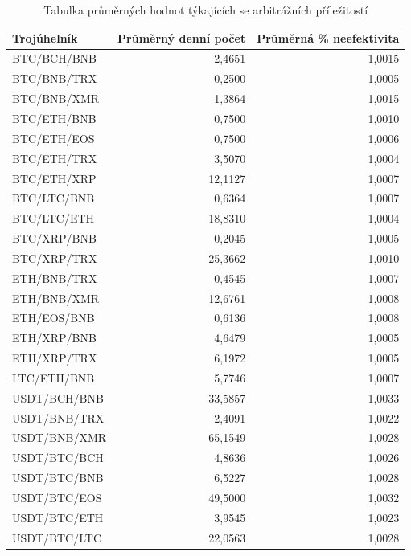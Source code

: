 \documentclass[thesis=B,czech]{FITthesis}[2019/03/21]
\begin{document}

\begin{table}\centering
\caption{Tabulka průměrných hodnot týkajících se arbitrážních příležitostí}
\label{table_averages}
\begin{tabular}{|| l | r | r ||}\hline Trojúhelník & Průměrný denní počet & Průměrná \% neefektivita\\ [0.5ex]
 \hline\hline BTC/BCH/BNB & 2,4651 & 1,0015\\ 
 \hline BTC/BNB/TRX & 0,2500 & 1,0005\\ 
 \hline BTC/BNB/XMR & 1,3864 & 1,0015\\ 
 \hline BTC/ETH/BNB & 0,7500 & 1,0010\\ 
 \hline BTC/ETH/EOS & 0,7500 & 1,0006\\ 
 \hline BTC/ETH/TRX & 3,5070 & 1,0004\\ 
 \hline BTC/ETH/XRP & 12,1127 & 1,0007\\ 
 \hline BTC/LTC/BNB & 0,6364 & 1,0007\\ 
 \hline BTC/LTC/ETH & 18,8310 & 1,0004\\ 
 \hline BTC/XRP/BNB & 0,2045 & 1,0005\\ 
 \hline BTC/XRP/TRX & 25,3662 & 1,0010\\ 
 \hline ETH/BNB/TRX & 0,4545 & 1,0007\\ 
 \hline ETH/BNB/XMR & 12,6761 & 1,0008\\ 
 \hline ETH/EOS/BNB & 0,6136 & 1,0008\\ 
 \hline ETH/XRP/BNB & 4,6479 & 1,0005\\ 
 \hline ETH/XRP/TRX & 6,1972 & 1,0005\\ 
 \hline LTC/ETH/BNB & 5,7746 & 1,0007\\ 
 \hline USDT/BCH/BNB & 33,5857 & 1,0033\\ 
 \hline USDT/BNB/TRX & 2,4091 & 1,0022\\ 
 \hline USDT/BNB/XMR & 65,1549 & 1,0028\\ 
 \hline USDT/BTC/BCH & 4,8636 & 1,0026\\ 
 \hline USDT/BTC/BNB & 6,5227 & 1,0028\\ 
 \hline USDT/BTC/EOS & 49,5000 & 1,0032\\ 
 \hline USDT/BTC/ETH & 3,9545 & 1,0023\\ 
 \hline USDT/BTC/LTC & 22,0563 & 1,0028\\ 

\end{tabular}
\end{table}
\end{document}
